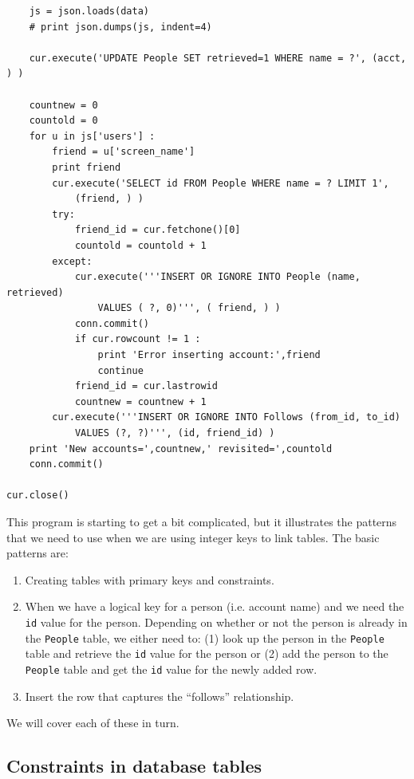 \begin{verbatim}
    js = json.loads(data)
    # print json.dumps(js, indent=4)

    cur.execute('UPDATE People SET retrieved=1 WHERE name = ?', (acct, ) )

    countnew = 0
    countold = 0
    for u in js['users'] :
        friend = u['screen_name']
        print friend
        cur.execute('SELECT id FROM People WHERE name = ? LIMIT 1', 
            (friend, ) )
        try:
            friend_id = cur.fetchone()[0]
            countold = countold + 1
        except:
            cur.execute('''INSERT OR IGNORE INTO People (name, retrieved) 
                VALUES ( ?, 0)''', ( friend, ) )
            conn.commit()
            if cur.rowcount != 1 :
                print 'Error inserting account:',friend
                continue
            friend_id = cur.lastrowid
            countnew = countnew + 1
        cur.execute('''INSERT OR IGNORE INTO Follows (from_id, to_id) 
            VALUES (?, ?)''', (id, friend_id) )
    print 'New accounts=',countnew,' revisited=',countold
    conn.commit()

cur.close()
\end{verbatim}
\afterverb
%
This program is starting to get a bit complicated, but it illustrates
the patterns that we need to use when we are
using integer keys to link tables. The basic patterns are:

\begin{enumerate}

\item Creating tables with primary keys and constraints.

\item When we have a logical key for a person (i.e. account
name) and we need the {\tt id} value for the person.
Depending on whether or not the person is already
in the {\tt People} table, we either need to: 
(1) look up the person in the {\tt People} table and 
retrieve the {\tt id} value for the person 
or (2) add the person to the {\tt People} table and get the 
{\tt id} value for the newly added row.

\item Insert the row that captures the ``follows'' relationship.

\end{enumerate}

We will cover each of these in turn.

\subsection{Constraints in database tables}

